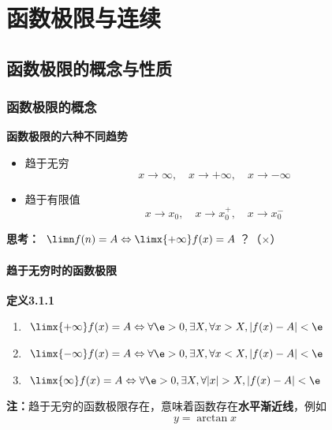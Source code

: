 \setcounter{chapter}{2}

\chapter{函数极限与连续}

\section{函数极限的概念与性质}

\subsection{函数极限的概念}

{\bf 函数极限的六种不同趋势}

\begin{itemize}
  \setlength{\itemindent}{1cm}
  \item 趋于无穷
  $$x\to\infty,\quad x\to+\infty,\quad x\to-\infty$$
  \item 趋于有限值
  $$x\to x_0,\quad x\to x_0^+,\quad x\to x_0^-$$
\end{itemize}

{\bf 思考：} $\limn f(n)=A\Leftrightarrow\limx{+\infty}f(x)=A$？（$\times$）

\subsubsection{趋于无穷时的函数极限}

{\bf 定义3.1.1}
\begin{enumerate}[(1)]
  \setlength{\itemindent}{1cm}
  \item $\limx{+\infty}f(x)=A\Leftrightarrow\forall \e>0,\exists X,\forall
  x>X,|f(x)-A|<\e$
  \item $\limx{-\infty}f(x)=A\Leftrightarrow\forall \e>0,\exists X,\forall
  x<X,|f(x)-A|<\e$
  \item $\limx{\infty}f(x)=A\Leftrightarrow\forall \e>0,\exists X,\forall
  |x|>X,|f(x)-A|<\e$
\end{enumerate}

{\bf 注：}趋于无穷的函数极限存在，意味着函数存在{\bf 水平渐近线}，例如
$$y=\arctan x$$

\begin{center}
\end{center}

